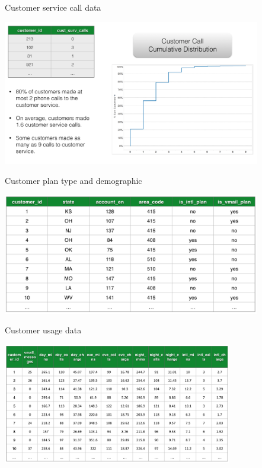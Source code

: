 \documentclass[10pt]{beamer}
\begin{document}
    \begin{frame}{Customer service call data}
      \begin{center}
        \includegraphics[height=180pt]{../graphs/datasets_cust_call}
      \end{center}
    \end{frame}

    \begin{frame}{Customer plan type and demographic}
        \begin{center}
          \includegraphics[height=150pt]{../graphs/datasets_customer_account}
        \end{center}
    \end{frame}

    \begin{frame}{Customer usage data}
        \begin{center}
          \includegraphics[height=150pt]{../graphs/datasets_customer_usage}
        \end{center}
    \end{frame}
\end{document}
